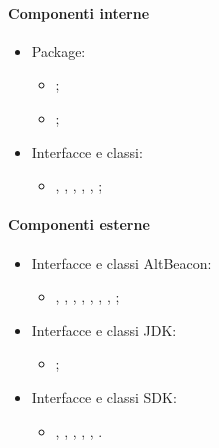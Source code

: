 \documentclass[../Funzionalita.tex]{subfiles}
\begin{document}
			\paragraph*{Componenti interne}
			\begin{itemize}
			
				\item Package:
				\begin{itemize}
					\item[] \model;
					\item[] \beacon;
				\end{itemize}
				
				\item Interfacce e classi:
				\begin{itemize}
					\item[] \BeaconManagerAdapter, \MyBeacon, \MyBeaconImp, \MyDistanceCalculator, \LocalBinder, \BeaconRanger;
				\end{itemize}
												
			\end{itemize}
			
			\paragraph*{Componenti esterne}
			\begin{itemize}
			
				\item Interfacce e classi AltBeacon:
				\begin{itemize}
					\item[] \BeaconManager, \BootstrapNotifier, \BeaconConsumer, \RangeNotifier, \Region, \BeaconParser, \DistanceCalculator, \Beacon;
				\end{itemize}
			
				\item Interfacce e classi JDK:
				\begin{itemize}
					\item[] \PriorityQueue;
				\end{itemize}
				
				\item Interfacce e classi SDK:
				\begin{itemize}
					\item[] \Intent, \LocalBroadcastManager, \Service, \Binder, \LocalBroadcastManager, \IBinder.
				\end{itemize}
				
				
				
			\end{itemize}
			
\end{document}

